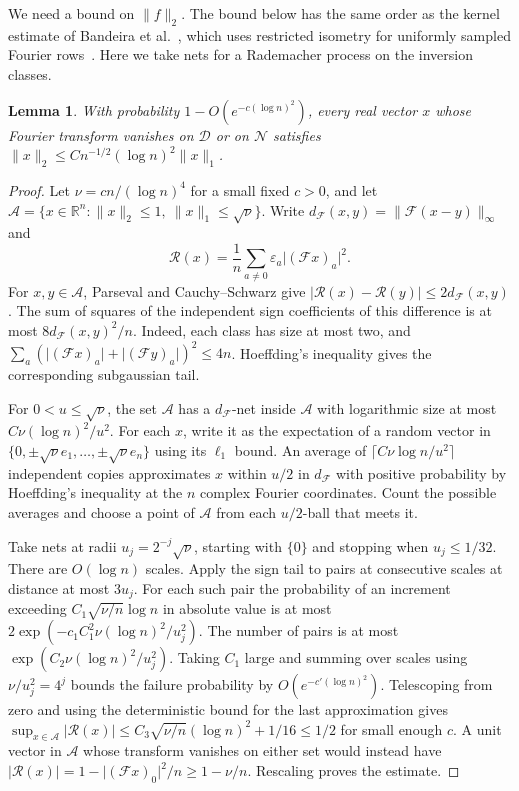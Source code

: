 \documentclass[11pt,letterpaper]{article}
\newtheorem{lemma}{Lemma}[section]
\newcommand{\abs}[1]{\lvert #1\rvert}
\newcommand{\norm}[1]{\lVert #1\rVert}
\begin{document}
We need a bound on \(\norm f_2\). The bound below has the same order
as the kernel estimate of Bandeira et al.~\cite{BBDFKK}, which uses
restricted isometry for uniformly sampled Fourier rows~\cite{HR}.
Here we take nets for a Rademacher process on the inversion classes.

\begin{lemma}\label{lem:kernel}
With probability \(1-O(e^{-c(\log n)^2})\), every real vector \(x\)
whose Fourier transform vanishes on \(\mathcal D\) or on \(\mathcal N\)
satisfies \(\norm x_2\le C n^{-1/2}(\log n)^2\norm x_1\).
\end{lemma}

\begin{proof}
Let \(\nu=cn/(\log n)^4\) for a small fixed \(c>0\), and let
\(\mathcal A=\{x\in\mathbb R^n:\norm x_2\le1,\ \norm x_1\le\sqrt{\nu}\}\).
Write \(d_{\mathcal F}(x,y)=\norm{\mathcal F(x-y)}_\infty\) and
\[
 \mathcal R(x)=\frac1n\sum_{a\ne0}\varepsilon_a\abs{(\mathcal F x)_a}^2.
\]
For \(x,y\in\mathcal A\), Parseval and Cauchy--Schwarz give
\(\abs{\mathcal R(x)-\mathcal R(y)}\le2d_{\mathcal F}(x,y)\). The sum of
squares of the independent sign coefficients of this difference is
at most \(8d_{\mathcal F}(x,y)^2/n\).
Indeed, each class has size at most two, and
\(\sum_a (\abs{(\mathcal F x)_a}+\abs{(\mathcal F y)_a})^2\le4n\).
Hoeffding's inequality gives the corresponding subgaussian tail.

For \(0<u\le\sqrt{\nu}\), the set \(\mathcal A\) has a \(d_{\mathcal F}\)-net inside
\(\mathcal A\) with logarithmic size at most \(C \nu(\log n)^2/u^2\).
For each \(x\), write it as the expectation of a random vector in
\(\{0,\pm\sqrt{\nu} e_1,\ldots,\pm\sqrt{\nu} e_n\}\) using its \(\ell_1\)
bound. An average of \(\lceil C \nu\log n/u^2\rceil\) independent
copies approximates \(x\) within \(u/2\) in \(d_{\mathcal F}\) with positive
probability by Hoeffding's inequality at the \(n\) complex Fourier
coordinates. Count the possible averages and choose a point of
\(\mathcal A\) from each \(u/2\)-ball that meets it.

Take nets at radii \(u_j=2^{-j}\sqrt{\nu}\), starting with \(\{0\}\) and
stopping when \(u_j\le1/32\). There are \(O(\log n)\) scales. Apply the
sign tail to pairs at consecutive scales at distance at most \(3u_j\).
For each such pair the probability of an increment exceeding
\(C_1\sqrt{\nu/n}\log n\) in absolute value is at most
\(2\exp(-c_1 C_1^2 \nu(\log n)^2/u_j^2)\).
The number of pairs is at most \(\exp(C_2\nu(\log n)^2/u_j^2)\).
Taking \(C_1\) large and summing over scales using \(\nu/u_j^2=4^j\)
bounds the failure probability by \(O(e^{-c'(\log n)^2})\).
Telescoping from zero and using the deterministic bound for the
last approximation gives
\(\sup_{x\in\mathcal A}\abs{\mathcal R(x)}\le C_3\sqrt{\nu/n}(\log n)^2+1/16\le1/2\)
for small enough \(c\). A unit vector in \(\mathcal A\) whose transform
vanishes on either set would instead have
\(\abs{\mathcal R(x)}=1-\abs{(\mathcal F x)_0}^2/n\ge1-\nu/n\). Rescaling proves
the estimate.
\end{proof}
\end{document}
